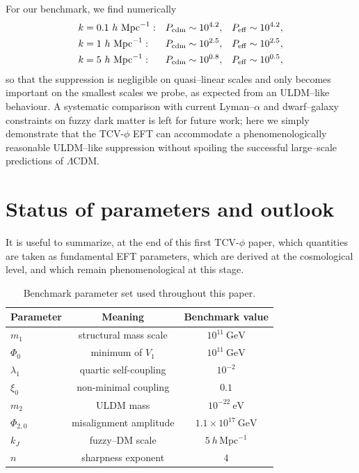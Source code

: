 \documentclass[aps,prd,onecolumn,nofootinbib,superscriptaddress]{revtex4-2}
\begin{document}
For our benchmark, we find numerically
\begin{align}
  k &= 0.1~h~\mathrm{Mpc}^{-1}:
  &
  P_{\rm cdm} &\sim 10^{4.2},
  &
  P_{\rm eff} &\sim 10^{4.2},
  \\
  k &= 1~h~\mathrm{Mpc}^{-1}:
  &
  P_{\rm cdm} &\sim 10^{2.5},
  &
  P_{\rm eff} &\sim 10^{2.5},
  \\
  k &= 5~h~\mathrm{Mpc}^{-1}:
  &
  P_{\rm cdm} &\sim 10^{0.8},
  &
  P_{\rm eff} &\sim 10^{0.5},
\end{align}
so that the suppression is negligible on quasi--linear scales and only becomes important on the smallest scales we probe, as expected from an ULDM--like behaviour.
A systematic comparison with current Lyman--$\alpha$ and dwarf--galaxy constraints on fuzzy dark matter is left for future work; here we simply demonstrate that the TCV-$\phi$ EFT can accommodate a phenomenologically reasonable ULDM--like suppression without spoiling the successful large--scale predictions of $\Lambda$CDM.

\section{Status of parameters and outlook}
\label{sec:discussion}

It is useful to summarize, at the end of this first TCV-$\phi$ paper, which quantities are taken as fundamental EFT parameters, which are derived at the cosmological level, and which remain phenomenological at this stage.

\begin{table}[t]
  \centering
  \begin{tabular}{lcc}
    \hline\hline
    Parameter & Meaning & Benchmark value \\
    \hline
    $m_1$       & structural mass scale & $10^{11}~\mathrm{GeV}$ \\
    $\Phi_0$    & minimum of $V_1$      & $10^{11}~\mathrm{GeV}$ \\
    $\lambda_1$ & quartic self-coupling & $10^{-2}$ \\
    $\xi_0$     & non-minimal coupling  & $0.1$ \\
    $m_2$       & ULDM mass             & $10^{-22}~\mathrm{eV}$ \\
    $\Phi_{2,0}$& misalignment amplitude& $1.1\times 10^{17}~\mathrm{GeV}$ \\
    $k_J$       & fuzzy--DM scale       & $5~h\,\mathrm{Mpc}^{-1}$ \\
    $n$         & sharpness exponent    & $4$ \\
    \hline\hline
  \end{tabular}
  \caption{Benchmark parameter set used throughout this paper.}
  \label{tab:benchmarks}
\end{table}
\end{document}
